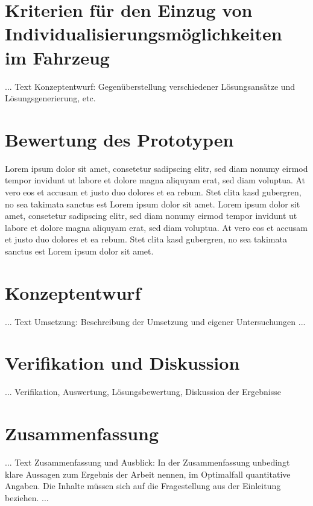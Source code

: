 \chapter{Kriterien für den Einzug von Individualisierungsmöglichkeiten im Fahrzeug }
\label{cha:Kriterien}


... Text Konzeptentwurf: Gegenüberstellung verschiedener Lösungsansätze und Lösungsgenerierung, etc.

\chapter{Bewertung des Prototypen}
\label{cha:Bewertung}
Lorem ipsum dolor sit amet, consetetur sadipscing elitr, sed diam nonumy eirmod tempor invidunt ut labore et dolore magna aliquyam erat, sed diam voluptua. At vero eos et accusam et justo duo dolores et ea rebum. Stet clita kasd gubergren, no sea takimata sanctus est Lorem ipsum dolor sit amet. Lorem ipsum dolor sit amet, consetetur sadipscing elitr, sed diam nonumy eirmod tempor invidunt ut labore et dolore magna aliquyam erat, sed diam voluptua. At vero eos et accusam et justo duo dolores et ea rebum. Stet clita kasd gubergren, no sea takimata sanctus est Lorem ipsum dolor sit amet.

\chapter{Konzeptentwurf}
\label{cha:Konzeptentwurf}

... Text Umsetzung: Beschreibung der Umsetzung und eigener Untersuchungen ...



\chapter{Verifikation und Diskussion}
\label{cha:Verifikation}

... Verifikation, Auswertung, Lösungsbewertung, Diskussion der Ergebnisse

\chapter{Zusammenfassung}
\label{cha:zusammenfassung}

... Text Zusammenfassung und Ausblick: In der Zusammenfassung unbedingt klare Aussagen zum Ergebnis der Arbeit nennen, im Optimalfall quantitative Angaben. Die Inhalte müssen sich auf die Fragestellung aus der Einleitung  beziehen. ...